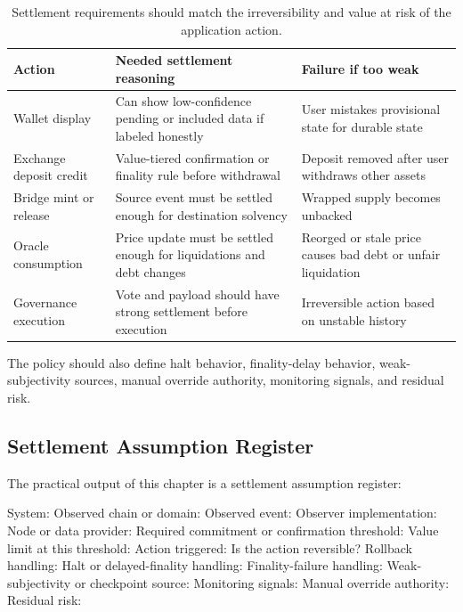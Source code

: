 \begin{table}[htbp]
\centering
\small
\renewcommand{\arraystretch}{1.18}
\begin{tabularx}{\textwidth}{@{}>{\RaggedRight\arraybackslash}p{}>{\RaggedRight\arraybackslash}p{}X@{}}
\toprule
Action & Needed settlement reasoning & Failure if too weak \\
\midrule
Wallet display & Can show low-confidence pending or included data if labeled honestly & User mistakes provisional state for durable state \\
Exchange deposit credit & Value-tiered confirmation or finality rule before withdrawal & Deposit removed after user withdraws other assets \\
Bridge mint or release & Source event must be settled enough for destination solvency & Wrapped supply becomes unbacked \\
Oracle consumption & Price update must be settled enough for liquidations and debt changes & Reorged or stale price causes bad debt or unfair liquidation \\
Governance execution & Vote and payload should have strong settlement before execution & Irreversible action based on unstable history \\
\bottomrule
\end{tabularx}
\caption{Settlement requirements should match the irreversibility and value at risk of the application action.}
\end{table}

The policy should also define halt behavior, finality-delay behavior, weak-subjectivity sources, manual override authority, monitoring signals, and residual risk.

\subsection{Settlement Assumption Register}

The practical output of this chapter is a settlement assumption register:

\begin{codeblock}
System:
Observed chain or domain:
Observed event:
Observer implementation:
Node or data provider:
Required commitment or confirmation threshold:
Value limit at this threshold:
Action triggered:
Is the action reversible?
Rollback handling:
Halt or delayed-finality handling:
Finality-failure handling:
Weak-subjectivity or checkpoint source:
Monitoring signals:
Manual override authority:
Residual risk:
\end{codeblock}

